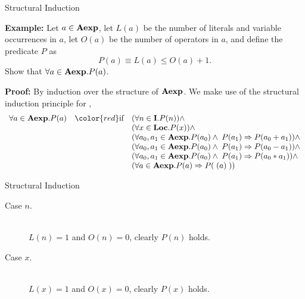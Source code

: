 \documentclass{beamer}
\begin{document}
\begin{frame}{Structural Induction}

\small
{\bf Example:} Let $a\in\mbox{\bf Aexp}$, let $L(a)$ be the number of literals and variable occurrences in $a$, let 
$O(a)$ be the number of operators in $a$, and define the predicate $P$ as
\[
P(a) \equiv L(a)  \le O(a) + 1.
\]
Show that $\forall a \in \mbox{\bf Aexp}. P(a)$. 

\vspace{.2in}

{\bf Proof:} By induction over the structure of $\mbox{\bf Aexp}$.  We make use of the structural induction principle
for ,
\[
\begin{array}{rcl}
\forall a \in \syntaxset{Aexp}. P(a) &{\color{red}\mbox{if}} & (\forall n \in \syntaxset{I}. P(n))\wedge \\
		&& (\forall x \in \syntaxset{Loc}.  P(x)) \wedge \\
		&& (\forall a_0, a_1 \in \syntaxset{Aexp}. P(a_0) \wedge\; P(a_1) \Rightarrow P(a_0 + a_1)) \wedge \\
		&& (\forall a_0, a_1 \in \syntaxset{Aexp}. P(a_0) \wedge\; P(a_1) \Rightarrow P(a_0 - a_1)) \wedge \\
		&& (\forall a_0, a_1 \in \syntaxset{Aexp}. P(a_0) \wedge\; P(a_1) \Rightarrow P(a_0 * a_1)) \wedge \\
		&& (\forall a \in \syntaxset{Aexp}. P(a) \Rightarrow P( \; ( a )\; )) 
\end{array}
\]


\end{frame}

\begin{frame}{Structural Induction}

\small
\begin{description}
\item[Case $n$.] \hspace{.1in}\\ 
$ L(n) = 1$ and $O(n) = 0$, clearly $P(n)$ holds. 
\item[Case  $x$.] \hspace{.1in}\\ 
$ L(x) = 1$ and $O(x) = 0$, clearly $P(x)$ holds. 
\end{description}
\end{frame}
\end{document}
